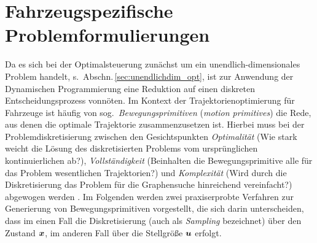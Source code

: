 \section{Fahrzeugspezifische Problemformulierungen}
Da es sich bei der Optimalsteuerung zunächst um ein unendlich-dimensionales Problem handelt, s.\ Abschn.\,\ref{sec:unendlichdim_opt}, ist zur Anwendung der Dynamischen Programmierung %
eine Reduktion auf einen diskreten %
Entscheidungsprozess vonnöten.
Im Kontext der Trajektorienoptimierung für Fahrzeuge ist häufig von sog.\ \emph{Bewegungsprimitiven} (\emph{motion primitives}) die Rede, aus denen die optimale Trajektorie zusammenzusetzen ist.
Hierbei
muss bei der Problemdiskretisierung zwischen den Gesichtspunkten \emph{Optimalität} (Wie stark weicht die Lösung des diskretisierten Problems vom ursprünglichen kontinuierlichen ab?), \emph{Vollständigkeit} (Beinhalten die Bewegungsprimitive alle für das Problem wesentlichen Trajektorien?) und \emph{Komplexität} (Wird durch die Diskretisierung das Problem für die Graphensuche hinreichend vereinfacht?) abgewogen werden \cite{lavalle2006pa, pivtoraiko2009differentially}. Im Folgenden werden zwei praxiserprobte Verfahren zur Generierung von Bewegungsprimitiven vorgestellt, die sich darin unterscheiden, dass im einen Fall die Diskretisierung (auch als \emph{Sampling} bezeichnet) über den Zustand  $\boldsymbol{x}$, im anderen Fall %
über die Stellgröße $\boldsymbol{u}$ erfolgt.

